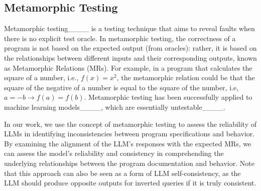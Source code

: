 \subsection{Metamorphic Testing}
Metamorphic testing____ is a testing technique that aims to reveal faults when there is no explicit test oracle. In metamorphic testing, the correctness of a program is not based on the expected output (from oracles): rather, it is based on the relationships between different inputs and their corresponding outputs, known as Metamorphic Relations (MRs). For example, in a program that calculates the square of a number, i.e., $f(x) = x^2$, the metamorphic relation could be that the square of the negative of a number is equal to the square of the number, i.e, $a = -b \rightarrow f(a) = f(b)$. Metamorphic testing has been successfully applied to machine learning models____, which are essentially untestable____.

In our work, we use the concept of metamorphic testing to assess the reliability of LLMs in identifying inconsistencies between program specifications and behavior. 
By examining the alignment of the LLM's responses with the expected MRs, we can assess the model's reliability and consistency in comprehending the underlying relationships between the program documentation and behavior. Note that this approach can also be seen as a form of LLM self-consistency, as the LLM should produce opposite outputs for inverted queries if it is truly consistent.



